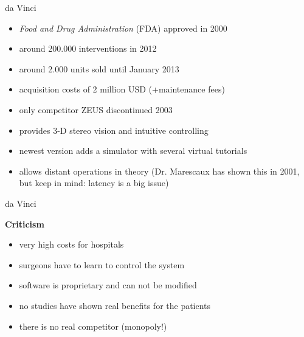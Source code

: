 \begin{frame}{da Vinci}

	\begin{itemize}
		\item \textit{Food and Drug Administration} (FDA) approved in 2000
		\item around 200.000 interventions in 2012
		\item around 2.000 units sold until January 2013
		\item acquisition costs of 2 million USD (+maintenance fees)
		\item only competitor ZEUS discontinued 2003
		\item provides 3-D stereo vision and intuitive controlling
		\item newest version adds a simulator with several virtual tutorials
		\item allows distant operations in theory (Dr. Marescaux has shown this in 2001, but keep in mind: latency is a big issue)
	\end{itemize}

\end{frame}



\begin{frame}{da Vinci}

	\textbf{Criticism}
	\begin{itemize}
		\item very high costs for hospitals
		\item surgeons have to learn to control the system
		\item software is proprietary and can not be modified
		\item no studies have shown real benefits for the patients
		\item there is no real competitor (monopoly!)
	\end{itemize}

\end{frame}



